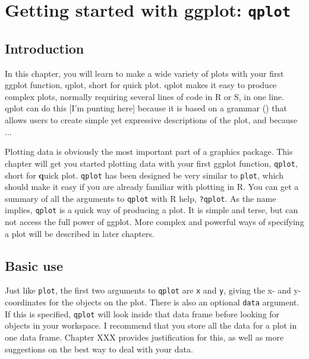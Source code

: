 



\chapter{Getting started with ggplot: {\tt qplot}}

\section{Introduction} In this chapter, you will learn to make a wide variety of plots with your first ggplot function, qplot, short for quick plot. qplot makes it easy to produce complex plots, normally requiring several lines of code in R or S, in one line. qplot can do this [I'm punting here] because it is based on a grammar () that allows users to create simple yet expressive descriptions of the plot, and because ...

Plotting data is obviously the most important part of a graphics package.  This chapter will get you started plotting data with your first ggplot function, {\tt qplot}, short for {\bf q}uick plot.  {\tt qplot} has been designed be very similar to {\tt plot}, which should make it easy if you are already familiar with plotting in R.  You can get a summary of all the arguments to {\tt qplot} with R help, {\tt ?qplot}.  As the name implies, {\tt qplot} is a quick way of producing a plot.  It is simple and terse, but can not access the full power of ggplot.  More complex and powerful ways of specifying a plot will be described in later chapters.

\section{Basic use}\label{sec:basic_use}

Just like {\tt plot}, the first two arguments to {\tt qplot} are {\tt x} and {\tt y}, giving the x- and y-coordinates for the objects on the plot. There is also an optional {\tt data} argument.  If this is specified, {\tt qplot} will look inside that data frame before looking for objects in your workspace.  I recommend that you store all the data for a plot in one data frame.  Chapter XXX provides justification for this, as well as more suggestions on the best way to deal with your data.  

